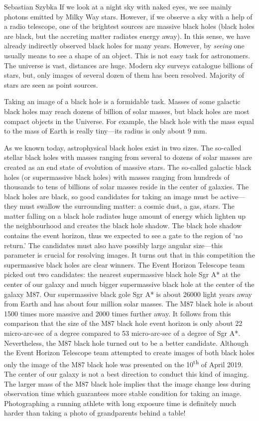 \begin{artengenv}{Sebastian Szybka}
If we look at a night sky with naked eyes, we see mainly photons emitted by Milky Way stars. However, if we observe a sky with a help of a radio telescope, one of the brightest sources are massive black holes (black holes are black, but the accreting matter radiates energy away). In this sense, we have already indirectly observed black holes for many years. However, by \textit{seeing} one usually means to see a shape of an object. This is not easy task for astronomers. The universe is vast, distances are huge. Modern sky surveys catalogue billions of stars, but, only images of several dozen of them has been resolved. Majority of stars are seen as point sources. 

Taking an image of a black hole is a formidable task. Masses of some galactic black holes may reach dozens of billion of solar masses, but black holes are most compact objects in the Universe. For example, the black hole with the mass equal to the mass of Earth is really tiny---its radius is only about $9$ mm. 

As we known today, astrophysical black holes exist in two sizes. The so-called stellar black holes with masses ranging from several to dozens of solar masses are created as an end state of evolution of massive stars. The so-called galactic black holes (or supermassive black holes) with masses ranging from hundreds of thousands to tens of billions of solar masses reside in the center of galaxies. The black holes are black, so good candidates for taking an image must be active---they must swallow the surrounding matter:  a cosmic dust, a gas, stars. The matter falling on a black hole radiates huge amount of energy which lighten up the neighbourhood and creates the black hole shadow. The black hole shadow contains the event horizon, thus we expected to see a gate to the region of `no return.' The candidates must also have possibly large angular size---this parameter is crucial for resolving images. It turns out that in this competition the supermassive black holes are clear winners. The Event Horizon Telescope team picked out two candidates: the nearest supermassive black hole Sgr A* at the center of our galaxy and much bigger supermassive black hole at the center of the galaxy M87. Our supermassive black gole Sgr A* is about 26000 light years away from Earth and has about four million solar masses. The M87 black hole is about 1500 times more massive and 2000 times further away. It follows from this comparison that the size of the M87 black hole event horizon is only about 22 micro-arc-sec of a degree compared to 53 micro-arc-sec of a degree of Sgr A*. Nevertheless, the M87 black hole turned out to be a better candidate. Although the Event Horizon Telescope team attempted to create images of both black holes only the image of the M87 black hole was presented on the 10\textsuperscript{th} of April 2019. The center of our galaxy is not a best direction to conduct this kind of imaging. The larger mass of the M87 black hole implies that the image change less during observation time which guarantees more stable condition for taking an image. Photographing a running athlete with long exposure time is definitely much harder than taking a photo of grandparents behind a table!


\end{artengenv}
